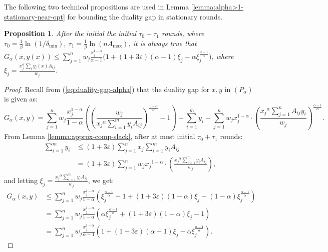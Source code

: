 \documentclass[11pt]{article}
\newtheorem{proposition}[theorem]{Proposition}
\begin{document}
The following two technical propositions are used in Lemma \ref{lemma:alpha>1-stationary-near-opt} for bounding the duality gap in stationary rounds.
\begin{proposition}\label{prop:alpha>1-duality-gap}
After the initial the initial $\tau_0 + \tau_1$ rounds, where $\tau_0 = \frac{1}{\beta}\ln(1/\delta_{\min})$, $\tau_1 = \frac{1}{\beta}\ln(nA_{\max})$, it is always true that $G_\alpha(x, y(x))\leq \sum_{j=1}^n w_j\frac{x_j^{1-\alpha}}{\alpha-1}\Big(1 + (1+3\varepsilon)(\alpha-1)\xi_j - \alpha\xi_j^{\frac{\alpha-1}{\alpha}} \Big)$, where $\xi_j = \frac{x_j^\alpha \sum_i y_i(x)A_{ij}}{w_j}$.
\end{proposition}
\begin{proof}
Recall from (\ref{eq:duality-gap-alpha}) that the duality gap for $x, y$ in $(P_\alpha)$ is given as: 
\begin{equation*}
G_{\alpha}(x, y)=\sum_{j=1}^n w_j\frac{x_j^{1-\alpha}}{1-\alpha}\left(\left(\frac{w_j}{{x_j}^{\alpha}\sum_{i=1}^m y_i A_{ij}}\right)^{\frac{1-\alpha}{\alpha}}-1\right) +\sum_{i=1}^m y_i - \sum_{j=1}^n  w_j x_j^{1-\alpha}\cdot \left(\frac{{x_j}^{\alpha}\sum_{j=1}^n A_{ij}y_i}{w_j}\right)^{\frac{\alpha-1}{\alpha}}.
\end{equation*}
From Lemma \ref{lemma:approx-comp-slack}, after at most initial $\tau_0+\tau_1$ rounds:
\begin{align*}
\sum_{i=1}^m y_i&\leq (1+3\varepsilon)\sum_{j=1}^nx_j\sum_{i=1}^m y_i A_{ij}\\
&=(1+3\varepsilon)\sum_{j=1}^n w_j{x_j}^{1-\alpha}\cdot\left(\frac{{x_j}^{\alpha}\sum_{i=1}^m y_i A_{ij}}{w_j}\right),
\end{align*}
and letting $\xi_j = \frac{{x_j}^{\alpha}\sum_{i=1}^m y_i A_{ij}}{w_j}$, we get:
\begin{align*}
G_{\alpha}(x, y)&\leq \sum_{j=1}^n w_j\frac{x_j^{1-\alpha}}{1-\alpha}\left(\xi_j^{\frac{\alpha-1}{\alpha}}-1 + (1+3\varepsilon)(1-\alpha)\xi_j -(1-\alpha)\xi_j^{\frac{\alpha-1}{\alpha}}\right)\\
&= \sum_{j=1}^n w_j\frac{x_j^{1-\alpha}}{1-\alpha}\left(\alpha\xi_j^{\frac{\alpha-1}{\alpha}}+ (1+3\varepsilon)(1-\alpha)\xi_j -1 \right)\\ 
&= \sum_{j=1}^n w_j\frac{x_j^{1-\alpha}}{\alpha-1}\left(1 + (1+3\varepsilon)(\alpha-1)\xi_j - \alpha\xi_j^{\frac{\alpha-1}{\alpha}} \right).
\end{align*}
\end{proof}
\end{document}
